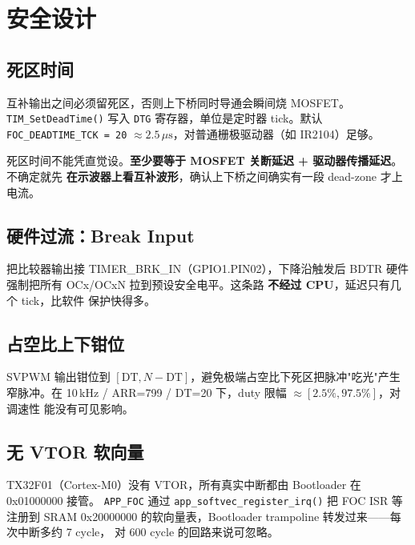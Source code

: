\documentclass[UTF8,a4paper,11pt]{ctexart}
\newcommand{\reg}[1]{\texttt{#1}}
\newcommand{\code}[1]{\texttt{#1}}
\begin{document}
\section{安全设计}

\subsection{死区时间}

互补输出之间必须留死区，否则上下桥同时导通会瞬间烧 MOSFET。\code{TIM\_SetDeadTime()}
写入 \reg{DTG} 寄存器，单位是定时器 tick。默认 \code{FOC\_DEADTIME\_TCK = 20}
$\approx 2.5\,\mu\text{s}$，对普通栅极驱动器（如 IR2104）足够。

\begin{trap}
死区时间不能凭直觉设。\textbf{至少要等于 MOSFET 关断延迟 + 驱动器传播延迟}。
不确定就先 \textbf{在示波器上看互补波形}，确认上下桥之间确实有一段 dead-zone 才上电流。
\end{trap}

\subsection{硬件过流：Break Input}

把比较器输出接 TIMER\_BRK\_IN（GPIO1.PIN02），下降沿触发后 BDTR 硬件强制把所有
OCx/OCxN 拉到预设安全电平。这条路 \textbf{不经过 CPU}，延迟只有几个 tick，比软件
保护快得多。

\subsection{占空比上下钳位}

SVPWM 输出钳位到 $[\text{DT}, N - \text{DT}]$，避免极端占空比下死区把脉冲"吃光"产生
窄脉冲。在 10\,kHz / ARR=799 / DT=20 下，duty 限幅 $\approx [2.5\%, 97.5\%]$，对调速性
能没有可见影响。

\subsection{无 VTOR 软向量}

TX32F01（Cortex-M0）没有 VTOR，所有真实中断都由 Bootloader 在 0x01000000 接管。
\code{APP\_FOC} 通过 \code{app\_softvec\_register\_irq()} 把 FOC ISR 等注册到 SRAM
0x20000000 的软向量表，Bootloader trampoline 转发过来——每次中断多约 7 cycle，
对 600 cycle 的回路来说可忽略。
\end{document}
